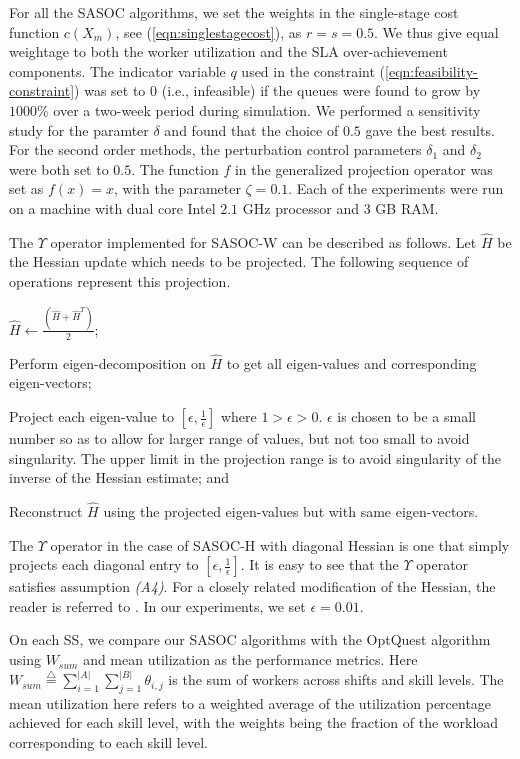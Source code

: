 \documentclass[11pt,letterpaper,english]{article}
\begin{document}
For all the SASOC algorithms, we set the weights
in the single-stage cost function $c(X_m)$, see
(\ref{eqn:singlestagecost}), as $r = s = 0.5$. We thus give equal
weightage to both the worker utilization and the SLA over-achievement
components. The indicator variable $q$ used in the constraint
(\ref{eqn:feasibility-constraint}) was set to $0$ (i.e., infeasible)
if the queues were found to grow by $1000\%$ over a two-week period
during simulation. We performed a sensitivity study for the paramter $\delta$
and found that the choice of $0.5$ gave the best results. For the second order
methods, the perturbation control parameters $\delta_1$ and $\delta_2$ were
both set to $0.5$. The function $f$ in the generalized projection operator was
set as $f(x) = x$, with the parameter $\zeta = 0.1$. Each of the experiments were run on a machine with dual core
Intel
$2.1$ GHz processor and $3$ GB RAM.

The
$\Upsilon$ operator implemented for SASOC-W can be described as
follows. Let $\hat{H}$ be the Hessian update which needs to be
projected. The following sequence of operations represent this
projection. \begin{inparaenum}[(i)] \item $\hat{H} \leftarrow
  \frac{(\hat{H} + \hat{H}^T)}{2}$; \item Perform eigen-decomposition
  on $\hat{H}$ to get all eigen-values and corresponding eigen-vectors; \item Project each eigen-value to $\left [ \epsilon,
    \frac{1}{\epsilon} \right ]$ where $1 > \epsilon > 0$. $\epsilon$
  is chosen to be a small number so as to allow for larger range of
  values, but not too small to avoid singularity. The upper limit in
  the projection range is to avoid singularity of the inverse of the
  Hessian estimate; and \item Reconstruct $\hat{H}$ using the
  projected eigen-values but with same eigen-vectors. \end{inparaenum}
The $\Upsilon$ operator in the case of SASOC-H
with diagonal Hessian is one that simply projects each diagonal entry to $\left [
  \epsilon, \frac{1}{\epsilon} \right ]$. It is easy to see that the
$\Upsilon$ operator satisfies assumption \textit{(A4)}. For a closely related
modification of the Hessian, the reader is referred to \citep{gill1981practical}.
In our experiments, we
set $\epsilon = 0.01$.

On each SS, we compare our SASOC algorithms with the OptQuest
algorithm using $W_{sum}$ and mean utilization as the performance metrics. Here $W_{sum}
\stackrel{\triangle}{=} \sum_{i=1}^{|A|}\sum_{j=1}^{|B|} \theta_{i,j}$ is
the sum of workers across shifts and skill levels. The mean utilization here refers to a weighted average of the utilization percentage achieved for each skill level, with the weights being the fraction of the workload corresponding to each skill level.
\end{document}
